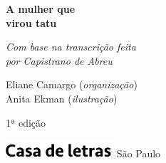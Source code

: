 




\begingroup\thispagestyle{empty}\vspace*{.05\textheight} 

              {\formular
              \huge
              \noindent
              \textbf{A mulher que\\ 
              virou tatu}\\
              
              \vspace{-0.5cm}
              
              }

              \vspace{0.5cm}

              \noindent{}\textit{Com base na transcrição feita\\ por Capistrano de Abreu}              

              \vfill              

              {\small
              \noindent{}Eliane Camargo (\textit{organização})\vspace{0.2cm}\\
              \noindent{}Anita Ekman (\textit{ilustração})
              }

              \vspace{0.5cm}

              {\small\noindent{}1ª edição}

              \vfill
              
              \noindent\includegraphics[width=0.3\textwidth]{LOGO_CDL.png}
              \break{} 
              \smallskip
              {\fontsize{30}{40}%
              \scriptsize\noindent São Paulo\quad\the\year}

\endgroup
\pagebreak